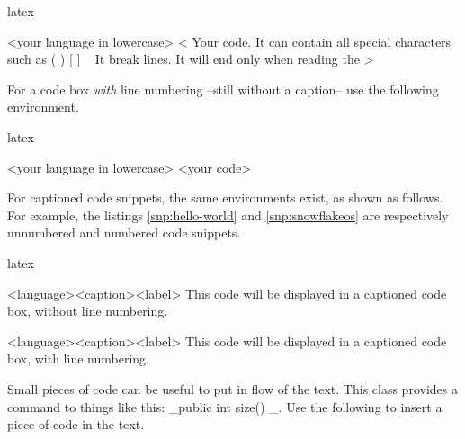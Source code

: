 \documentclass[
	a4paper,
	raggedright,
	twoside,
	12pt,
	colorful,
]{tufte-style-article}
\begin{document}
%
\begin{altcodebox}{latex}
\begin{codebox}{<your language in lowercase>}
<
Your code. It can contain all special characters such as { } ( ) [ ] \ %
It break lines.
It will end only when reading the %
>
\end{codebox}
\end{altcodebox}

For a code box \textit{with} line numbering --still without a caption-- use the following environment.
\begin{altcodebox}{latex}
\begin{codeboxnum}{<your language in lowercase>}
<your code>
\end{codeboxnum}
\end{altcodebox}

For captioned code snippets, the same environments exist, as shown as follows. For example, the listings \ref{snp:hello-world} and \ref{snp:snowflakeos} are respectively unnumbered and numbered code snippets.

\begin{codebox}{latex}
\begin{snippet}{<language>}{<caption>}{<label>}
This code will be displayed in a captioned code box, without line numbering.
\end{snippet}

\begin{snippetnum}{<language>}{<caption>}{<label>}
This code will be displayed in a captioned code box, with line numbering.
\end{snippetnum}
\end{codebox}

Small pieces of code can be useful to put in flow of the text. This class provides a command to things like this: _public int size() {}_. Use the following to insert a piece of code in the text.
\end{document}
